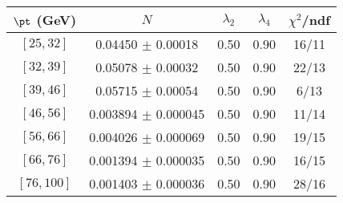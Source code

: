 \begin{tabular}{c||c|c|c|c}
$\pt$ (GeV) & $N$ & $\lambda_{2}$ & $\lambda_4$  & $\chi^2$/ndf  \\
\hline
$[25, 32]$ & 0.04450 $\pm$ 0.00018 & 0.50 & 0.90 & 16/11\\
$[32, 39]$ & 0.05078 $\pm$ 0.00032 & 0.50 & 0.90 & 22/13\\
$[39, 46]$ & 0.05715 $\pm$ 0.00054 & 0.50 & 0.90 & 6/13\\
$[46, 56]$ & 0.003894 $\pm$ 0.000045 & 0.50 & 0.90 & 11/14\\
$[56, 66]$ & 0.004026 $\pm$ 0.000069 & 0.50 & 0.90 & 19/15\\
$[66, 76]$ & 0.001394 $\pm$ 0.000035 & 0.50 & 0.90 & 16/15\\
$[76, 100]$ & 0.001403 $\pm$ 0.000036 & 0.50 & 0.90 & 28/16\\
\end{tabular}
